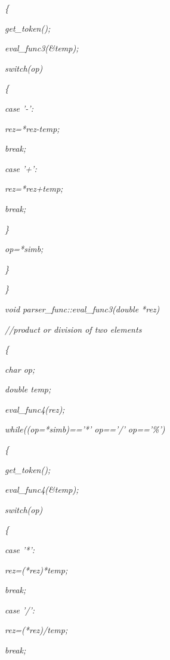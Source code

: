 \documentclass[a4paper,twoside]{book}
\begin{document}
\textit{\qquad \{}

\textit{\qquad \qquad get\_token();}

\textit{\qquad \qquad eval\_func3(\&temp);}

\textit{\qquad \qquad switch(op)}

\textit{\qquad \qquad \{}

\textit{\qquad \qquad case '-':}

\textit{\qquad \qquad \qquad *rez=*rez-temp;}

\textit{\qquad \qquad \qquad break;}

\textit{\qquad \qquad case '+':}

\textit{\qquad \qquad \qquad *rez=*rez+temp;}

\textit{\qquad \qquad \qquad break;}

\textit{\qquad \qquad \}}

\textit{\qquad \qquad op=*simb;}

\textit{\qquad \}}

\textit{\}}

\textit{void parser\_func::eval\_func3(double *rez)}

\textit{//product or division of two elements}

\textit{\{}

\textit{\qquad char op;}

\textit{\qquad double temp;}

\textit{\qquad }

\textit{\qquad eval\_func4(rez);}

\textit{\qquad while((op=*simb)=='*' \TEXTsymbol{\vert}\TEXTsymbol{\vert}
op=='/' \TEXTsymbol{\vert}\TEXTsymbol{\vert} op=='\%')}

\textit{\qquad \{}

\textit{\qquad \qquad get\_token();}

\textit{\qquad \qquad eval\_func4(\&temp);}

\textit{\qquad \qquad switch(op)}

\textit{\qquad \qquad \{}

\textit{\qquad \qquad case '*':}

\textit{\qquad \qquad \qquad *rez=(*rez)*temp;}

\textit{\qquad \qquad \qquad break;}

\textit{\qquad \qquad case '/':}

\textit{\qquad \qquad \qquad *rez=(*rez)/temp;}

\textit{\qquad \qquad \qquad break;}
\end{document}
